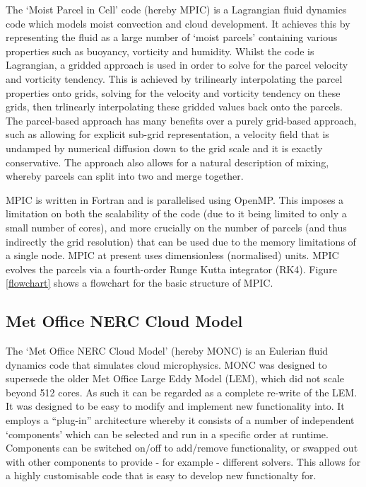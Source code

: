 \documentclass{article}
\begin{document}
The `Moist Parcel in Cell' code (hereby MPIC) is a Lagrangian fluid dynamics code which models moist convection and cloud development. It achieves this by representing the fluid as a large number of `moist parcels' containing various properties such as buoyancy, vorticity and humidity. Whilst the code is Lagrangian, a gridded approach is used in order to solve for the parcel velocity and vorticity tendency. This is achieved by trilinearly interpolating the parcel properties onto grids, solving for the velocity and vorticity tendency on these grids, then trlinearly interpolating these gridded values back onto the parcels. The parcel-based approach has many benefits over a purely grid-based approach, such as allowing for explicit sub-grid representation, a velocity field that is undamped by numerical diffusion down to the grid scale and it is exactly conservative. The approach also allows for a natural description of mixing, whereby parcels can split into two and merge together.

MPIC is written in Fortran and is parallelised using OpenMP. This imposes a limitation on both the scalability of the code (due to it being limited to only a small number of cores), and more crucially on the number of parcels (and thus indirectly the grid resolution) that can be used due to the memory limitations of a single node. MPIC at present uses dimensionless (normalised) units. MPIC evolves the parcels via a fourth-order Runge Kutta integrator (RK4). Figure \ref{flowchart} shows a flowchart for the basic structure of MPIC.


\subsection{Met Office NERC Cloud Model}

The `Met Office NERC Cloud Model' (hereby MONC) is an Eulerian fluid dynamics code that simulates cloud microphysics. MONC was designed to supersede the older Met Office Large Eddy Model (LEM), which did not scale beyond 512 cores. As such it can be regarded as a complete re-write of the LEM. It was designed to be easy to modify and implement new functionality into. It employs a ``plug-in'' architecture whereby it consists of a number of independent `components' which can be selected and run in a specific order at runtime. Components can be switched on/off to add/remove functionality, or swapped out with other components to provide - for example - different solvers. This allows for a highly customisable code that is easy to develop new functionalty for.
\end{document}
